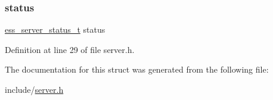 \subsubsection{\texorpdfstring{status}{status}}
{\footnotesize\ttfamily \hyperlink{server_8h_a66019638fd44eba9d951ec93754c7b8d}{ess\+\_\+server\+\_\+status\+\_\+t} status}



Definition at line 29 of file server.\+h.



The documentation for this struct was generated from the following file\+:\begin{DoxyCompactItemize}
\item 
include/\hyperlink{server_8h}{server.\+h}\end{DoxyCompactItemize}
